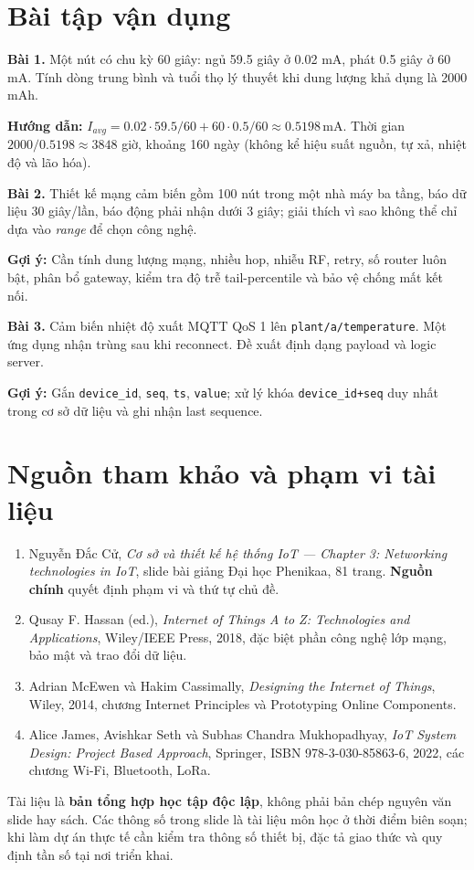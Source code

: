 \section{Bài tập vận dụng}
\textbf{Bài 1.} Một nút có chu kỳ 60 giây: ngủ 59.5 giây ở 0.02 mA, phát 0.5 giây ở 60 mA. Tính dòng trung bình và tuổi thọ lý thuyết khi dung lượng khả dụng là 2000 mAh.\par
\textbf{Hướng dẫn:} \(I_{avg}=0.02\cdot59.5/60+60\cdot0.5/60\approx0.5198\,\mathrm{mA}\). Thời gian \(2000/0.5198\approx3848\) giờ, khoảng 160 ngày (không kể hiệu suất nguồn, tự xả, nhiệt độ và lão hóa).\par\medskip
\textbf{Bài 2.} Thiết kế mạng cảm biến gồm 100 nút trong một nhà máy ba tầng, báo dữ liệu 30 giây/lần, báo động phải nhận dưới 3 giây; giải thích vì sao không thể chỉ dựa vào \emph{range} để chọn công nghệ.\par
\textbf{Gợi ý:} Cần tính dung lượng mạng, nhiều hop, nhiễu RF, retry, số router luôn bật, phân bổ gateway, kiểm tra độ trễ tail-percentile và bảo vệ chống mất kết nối.\par\medskip
\textbf{Bài 3.} Cảm biến nhiệt độ xuất MQTT QoS 1 lên \texttt{plant/a/temperature}. Một ứng dụng nhận trùng sau khi reconnect. Đề xuất định dạng payload và logic server.\par
\textbf{Gợi ý:} Gắn \texttt{device\_id}, \texttt{seq}, \texttt{ts}, \texttt{value}; xử lý khóa \texttt{device\_id+seq} duy nhất trong cơ sở dữ liệu và ghi nhận last sequence.
\section{Nguồn tham khảo và phạm vi tài liệu}
\begin{enumerate}[leftmargin=7mm]
\item Nguyễn Đắc Cử, \emph{Cơ sở và thiết kế hệ thống IoT — Chapter 3: Networking technologies in IoT}, slide bài giảng Đại học Phenikaa, 81 trang. \textbf{Nguồn chính} quyết định phạm vi và thứ tự chủ đề.
\item Qusay F. Hassan (ed.), \emph{Internet of Things A to Z: Technologies and Applications}, Wiley/IEEE Press, 2018, đặc biệt phần công nghệ lớp mạng, bảo mật và trao đổi dữ liệu.
\item Adrian McEwen và Hakim Cassimally, \emph{Designing the Internet of Things}, Wiley, 2014, chương Internet Principles và Prototyping Online Components.
\item Alice James, Avishkar Seth và Subhas Chandra Mukhopadhyay, \emph{IoT System Design: Project Based Approach}, Springer, ISBN 978-3-030-85863-6, 2022, các chương Wi-Fi, Bluetooth, LoRa.
\end{enumerate}
\begin{note}
Tài liệu là \textbf{bản tổng hợp học tập độc lập}, không phải bản chép nguyên văn slide hay sách. Các thông số trong slide là tài liệu môn học ở thời điểm biên soạn; khi làm dự án thực tế cần kiểm tra thông số thiết bị, đặc tả giao thức và quy định tần số tại nơi triển khai.
\end{note}